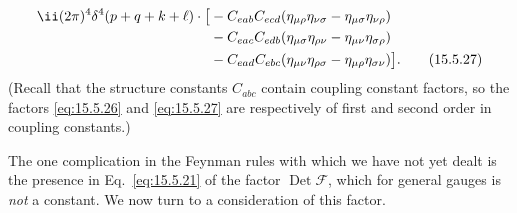 \begin{align}
  \ii(2\pi)^4\delta^4(p+q+k+\ell)\mathbin{\cdot}
  \bigl[{}&-C_{eab}C_{ecd}
  (\eta_{\mu\rho}\eta_{\nu\sigma}-\eta_{\mu\sigma}\eta_{\nu\rho})
  \notag\\
  &-C_{eac}C_{edb}
  (\eta_{\mu\sigma}\eta_{\rho\nu}-\eta_{\mu\nu}\eta_{\sigma\rho})
  \notag\\
  &-C_{ead}C_{ebc}
  (\eta_{\mu\nu}\eta_{\rho\sigma}-\eta_{\mu\rho}\eta_{\sigma\nu})\bigr].
  \tag{15.5.27}\label{eq:15.5.27}
\end{align}
(Recall that the structure constants $C_{abc}$ contain coupling
constant factors, so the factors \eqref{eq:15.5.26} and \eqref{eq:15.5.27} are
respectively of first and second order in coupling constants.)

The one complication in the Feynman rules with which we have not yet dealt is
the presence in Eq.~\eqref{eq:15.5.21} of the factor
$\operatorname{Det}\mathcal F$, which for general gauges is \emph{not} a
constant. We now turn to a consideration of this factor.
